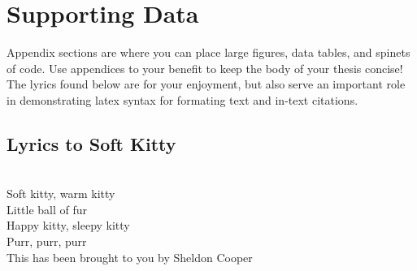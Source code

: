 \chapter{Supporting Data}

Appendix sections are where you can place large figures, data tables, and spinets of code. Use appendices to your benefit to keep the body of your thesis concise!\\

The lyrics found below are for your enjoyment, but also serve an important role in demonstrating latex syntax for formating text and in-text citations.  

\section{Lyrics to Soft Kitty}

\begin{center}
\mbox{}\\[0.2in]
Soft kitty, warm kitty\\
Little ball of fur\\
Happy kitty, sleepy kitty\\
Purr, purr, purr\\[0.5in]


This has been brought to you by Sheldon Cooper %
\end{center}

\clearpage